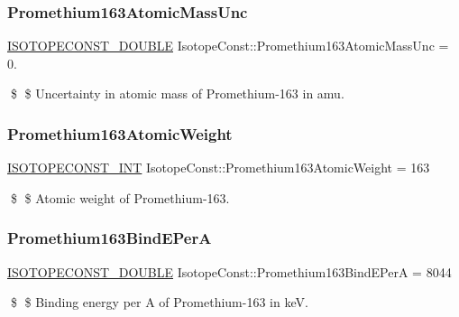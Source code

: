 \subsubsection{\texorpdfstring{Promethium163\+Atomic\+Mass\+Unc}{Promethium163AtomicMassUnc}}
{\footnotesize\ttfamily \mbox{\hyperlink{group___isotope_const-_macros_ga8f45a7272ce02c0b4c65c44636ed719a}{I\+S\+O\+T\+O\+P\+E\+C\+O\+N\+S\+T\+\_\+\+D\+O\+U\+B\+LE}} Isotope\+Const\+::\+Promethium163\+Atomic\+Mass\+Unc = 0.}

\$ \$ Uncertainty in atomic mass of Promethium-\/163 in amu. \mbox{\label{group___isotope_const-_promethium-_pm163_ga9ac426b6eb71174604d41a7e9dd56f98}} 
\subsubsection{\texorpdfstring{Promethium163\+Atomic\+Weight}{Promethium163AtomicWeight}}
{\footnotesize\ttfamily \mbox{\hyperlink{group___isotope_const-_macros_ga5f18360b3e99483a35c32d789e62621c}{I\+S\+O\+T\+O\+P\+E\+C\+O\+N\+S\+T\+\_\+\+I\+NT}} Isotope\+Const\+::\+Promethium163\+Atomic\+Weight = 163}

\$ \$ Atomic weight of Promethium-\/163. \mbox{\label{group___isotope_const-_promethium-_pm163_ga76386f20e4cf35f62157863f94ac4e61}} 
\subsubsection{\texorpdfstring{Promethium163\+Bind\+E\+PerA}{Promethium163BindEPerA}}
{\footnotesize\ttfamily \mbox{\hyperlink{group___isotope_const-_macros_ga8f45a7272ce02c0b4c65c44636ed719a}{I\+S\+O\+T\+O\+P\+E\+C\+O\+N\+S\+T\+\_\+\+D\+O\+U\+B\+LE}} Isotope\+Const\+::\+Promethium163\+Bind\+E\+PerA = 8044}

\$ \$ Binding energy per A of Promethium-\/163 in keV. \mbox{\label{group___isotope_const-_promethium-_pm163_ga717e484ceec2f3f5053c0806f2e82eca}} 
